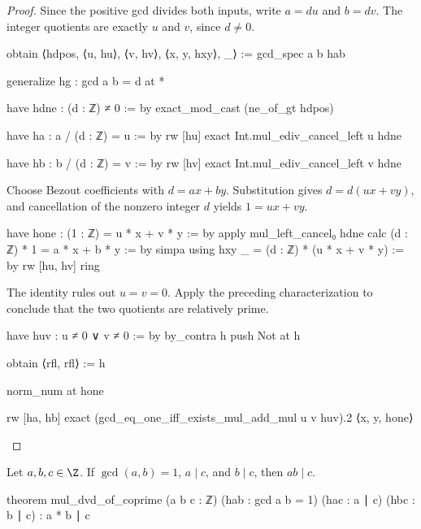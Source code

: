 \begin{proof}
  Since the positive gcd divides both inputs, write $a=du$ and $b=dv$. The integer quotients are exactly $u$ and $v$, since $d\ne0$.

  \begin{lean}
    obtain ⟨hdpos, ⟨u, hu⟩, ⟨v, hv⟩, ⟨x, y, hxy⟩, _⟩ := gcd_spec a b hab

    generalize hg : gcd a b = d at *

    have hdne : (d : ℤ) ≠ 0 := by
      exact_mod_cast (ne_of_gt hdpos)

    have ha : a / (d : ℤ) = u := by
      rw [hu]
      exact Int.mul_ediv_cancel_left u hdne

    have hb : b / (d : ℤ) = v := by
      rw [hv]
      exact Int.mul_ediv_cancel_left v hdne
  \end{lean}
  Choose Bezout coefficients with $d=ax+by$. Substitution gives $d=d(ux+vy)$, and cancellation of the nonzero integer $d$ yields $1=ux+vy$.

  \begin{lean}
    have hone : (1 : ℤ) = u * x + v * y := by
      apply mul_left_cancel₀ hdne
      calc
        (d : ℤ) * 1 = a * x + b * y := by
          simpa using hxy
        _ = (d : ℤ) * (u * x + v * y) := by
          rw [hu, hv]
          ring
  \end{lean}
  The identity rules out $u=v=0$. Apply the preceding characterization to conclude that the two quotients are relatively prime.

  \begin{lean}
    have huv : u ≠ 0 ∨ v ≠ 0 := by
      by_contra h
      push Not at h

      obtain ⟨rfl, rfl⟩ := h

      norm_num at hone

    rw [ha, hb]
    exact (gcd_eq_one_iff_exists_mul_add_mul u v huv).2 ⟨x, y, hone⟩
  \end{lean}
\end{proof}

\begin{corollary} \label{nt:thm:coprime-product-divides}
  Let $a,b,c\in\Z$. If $\gcd(a,b)=1$, $a\mid c$, and $b\mid c$, then $ab\mid c$.

  \begin{lean}
    theorem mul_dvd_of_coprime (a b c : ℤ) (hab : gcd a b = 1)
        (hac : a ∣ c) (hbc : b ∣ c) : a * b ∣ c
  \end{lean}
\end{corollary}

